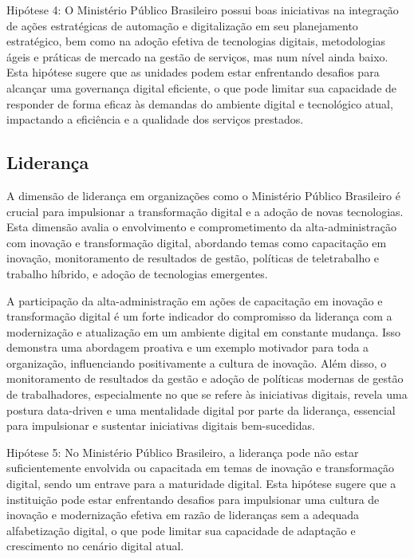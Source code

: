  Hipótese 4: O Ministério Público Brasileiro possui boas iniciativas na integração de ações estratégicas de automação e digitalização em seu planejamento estratégico, bem como na adoção efetiva de tecnologias digitais, metodologias ágeis e práticas de mercado na gestão de serviços, mas num nível ainda baixo. Esta hipótese sugere que as unidades podem estar enfrentando desafios para alcançar uma governança digital eficiente, o que pode limitar sua capacidade de responder de forma eficaz às demandas do ambiente digital e tecnológico atual, impactando a eficiência e a qualidade dos serviços prestados.
 
 \subsection{Liderança}

 A dimensão de liderança em organizações como o Ministério Público Brasileiro é crucial para impulsionar a transformação digital e a adoção de novas tecnologias. Esta dimensão avalia o envolvimento e comprometimento da alta-administração com inovação e transformação digital, abordando temas como capacitação em inovação, monitoramento de resultados de gestão, políticas de teletrabalho e trabalho híbrido, e adoção de tecnologias emergentes.

 A participação da alta-administração em ações de capacitação em inovação e transformação digital é um forte indicador do compromisso da liderança com a modernização e atualização em um ambiente digital em constante mudança. Isso demonstra uma abordagem proativa e um exemplo motivador para toda a organização, influenciando positivamente a cultura de inovação. Além disso, o monitoramento de resultados da gestão e adoção de políticas modernas de gestão de trabalhadores, especialmente no que se refere às iniciativas digitais, revela uma postura data-driven e uma mentalidade digital por parte da liderança, essencial para impulsionar e sustentar iniciativas digitais bem-sucedidas.

 Hipótese 5: No Ministério Público Brasileiro, a liderança pode não estar suficientemente envolvida ou capacitada em temas de inovação e transformação digital, sendo um entrave para a maturidade digital. Esta hipótese sugere que a instituição pode estar enfrentando desafios para impulsionar uma cultura de inovação e modernização efetiva em razão de lideranças sem a adequada alfabetização digital, o que pode limitar sua capacidade de adaptação e crescimento no cenário digital atual.

